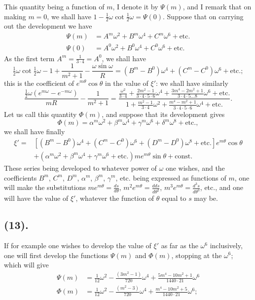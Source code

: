 \documentclass{article}
\begin{document}
This quantity being a function of $m$, I denote it by $\Psi(m)$, and I remark that on making $m=0$, we shall have $1-\frac{1}{2}\omega\cot\frac{1}{2}\omega=\Psi(0)$. Suppose that on carrying out the development we have
\[ \begin{aligned} \Psi(m)&=A^{m}\omega^{2}+B^{m}\omega^{4}+C^{m}\omega^{6}+\text{etc.}\\ \Psi(0)&=A^{0}\omega^{2}+B^{0}\omega^{4}+C^{0}\omega^{6}+\text{etc.} \end{aligned} \]
As the first term $A^{m}=\frac{1}{3\cdot4}=A^{0}$, we shall have
\[ \tfrac{1}{2}\omega\cot\tfrac{1}{2}\omega-1+\frac{1}{m^{2}+1}-\frac{\omega\sin\omega}{R}=(B^{m}-B^{0})\omega^{4}+(C^{m}-C^{0})\omega^{6}+\text{etc.}; \]
this is the coefficient of $e^{m\theta}\cos\theta$ in the value of $\xi'$: we shall have similarly
\[ \frac{\frac{1}{2}\omega(e^{m\omega}-e^{-m\omega})}{mR}-\frac{1}{m^{2}+1}=\frac{\frac{\omega^{2}}{3\cdot4}+\frac{2m^{2}-1}{3\cdot4\cdot5\cdot6}\omega^{4}+\frac{3m^{4}-2m^{2}+1}{3\cdot4\cdot5\ldots8}\omega^{6}+\text{etc.}}{1+\frac{m^{2}-1}{3\cdot4}\omega^{2}+\frac{m^{4}-m^{2}+1}{3\cdot4\cdot5\cdot6}\omega^{4}+\text{etc.}}. \]
Let us call this quantity $\Phi(m)$, and suppose that its development gives
\[ \Phi(m)=\alpha^{m}\omega^{2}+\beta^{m}\omega^{4}+\gamma^{m}\omega^{6}+\delta^{m}\omega^{8}+\text{etc.}, \]
we shall have finally
\[ \begin{aligned} \xi'={}&[(B^{m}-B^{0})\omega^{4}+(C^{m}-C^{0})\omega^{6}+(D^{m}-D^{0})\omega^{8}+\text{etc.}]e^{m\theta}\cos\theta\\ &+(\alpha^{m}\omega^{2}+\beta^{m}\omega^{4}+\gamma^{m}\omega^{6}+\text{etc.})me^{m\theta}\sin\theta+\text{const.} \end{aligned} \]
These series being developed to whatever power of $\omega$ one wishes, and the coefficients $B^{m}$, $C^{m}$, $D^{m}$, $\alpha^{m}$, $\beta^{m}$, $\gamma^{m}$, etc. being expressed as functions of $m$, one will make the substitutions $me^{m\theta}=\frac{ds}{d\theta}$, $m^{2}e^{m\theta}=\frac{dds}{d\theta^{2}}$, $m^{3}e^{m\theta}=\frac{d^{3}s}{d\theta^{3}}$, etc., and one will have the value of $\xi'$, whatever the function of $\theta$ equal to $s$ may be.

\subsection*{(13).}

If for example one wishes to develop the value of $\xi'$ as far as the $\omega^{6}$ inclusively, one will first develop the functions $\Psi(m)$ and $\Phi(m)$, stopping at the $\omega^{6}$; which will give
\[ \begin{aligned} \Psi(m)&=\frac{1}{12}\omega^{2}-\frac{(3m^{2}-1)}{720}\omega^{4}+\frac{5m^{4}-10m^{2}+1}{1440\cdot21}\omega^{6}\\ \Phi(m)&=\frac{1}{12}\omega^{2}-\frac{(m^{2}-3)}{720}\omega^{4}+\frac{m^{4}-10m^{2}+5}{1440\cdot21}\omega^{6}; \end{aligned} \]
\end{document}

